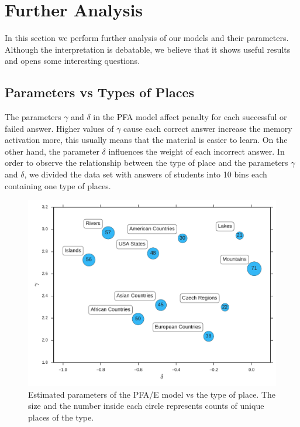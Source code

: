 \section{Further Analysis}
\label{further-analysis}

In this section we perform further analysis of our models and their parameters. Although the interpretation is debatable, we believe that it shows useful results and opens some interesting questions.

\subsection{Parameters vs Types of Places}

The parameters $\gamma$ and $\delta$ in the PFA model affect penalty for each successful or failed answer. Higher values of $\gamma$ cause each correct answer increase the memory activation more, this usually means that the material is easier to learn. On the other hand, the parameter $\delta$ influences the weight of each incorrect answer. In order to observe the relationship between the type of place and the parameters $\gamma$ and $\delta$, we divided the data set with answers of students into 10 bins each containing one type of places.

\begin{figure}[htbp]
  \centering
  \includegraphics[width=\textwidth]{img/gamma-vs-delta-vs-size}
  \caption{Estimated parameters of the PFA/E model vs the type of place. The size and the number inside each circle represents counts of unique places of the type.}
  \label{fig:gamma-vs-delta-vs-size}
\end{figure}

